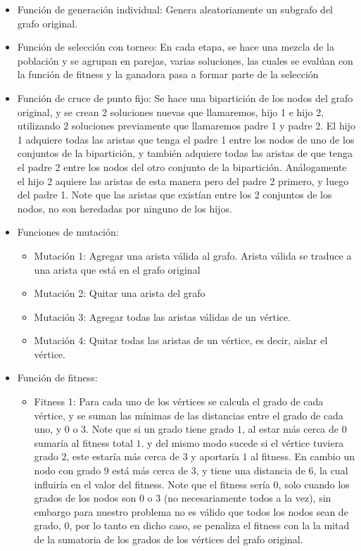 \documentclass{article}
\begin{document}
\begin{itemize}
	\item Función de generación individual: Genera aleatoriamente un subgrafo del grafo original.
	\item Función de selección con torneo: En cada etapa, se hace una mezcla de la población y se agrupan en parejas, varias soluciones, las cuales se evalúan con la función de fitness y la ganadora pasa a formar parte de la selección
	\item Función de cruce de punto fijo: Se hace una bipartición de los nodos del grafo original, y se crean 2 soluciones nuevas que llamaremos, hijo 1 e hijo 2, utilizando 2 soluciones previamente que llamaremos padre 1 y padre 2. El hijo 1 adquiere todas las aristas que tenga el padre 1 entre los nodos de uno de los conjuntos de la bipartición, y también adquiere todas las aristas de que tenga el padre 2 entre los nodos del otro conjunto de la bipartición. Análogamente el hijo 2 aquiere las aristas de esta manera pero del padre 2 primero, y luego del padre 1. Note que las aristas que existían entre los 2 conjuntos de los nodos, no son heredadas por ninguno de los hijos.
	\item Funciones de mutación:
	\begin{itemize}
		\item Mutación 1: Agregar una arista válida al grafo. Arista válida se traduce a una arista que está en el grafo original
		\item Mutación 2: Quitar una arista del grafo
		\item Mutación 3: Agregar todas las aristas válidas de un vértice.
		\item Mutación 4: Quitar todas las aristas de un vértice, es decir, aislar el vértice. 
	\end{itemize}
	\item Función de fitness:
	\begin{itemize}
		\item Fitness 1: Para cada uno de los vértices se calcula el grado de cada vértice, y se suman las mínimas de las distancias entre el grado de cada uno, y $0$ o $3$. Note que si un grado tiene grado $1$, al estar más cerca de $0$ sumaría al fitness total $1$. y del mismo modo sucede si el vértice tuviera grado $2$, este estaría más cerca de $3$ y aportaría $1$ al fitness. En cambio un nodo con grado $9$ está más cerca de $3$, y tiene una distancia de $6$, la cual influiría en el valor del fitness. Note que el fitness sería $0$, solo cuando los grados de los nodos son $0$ o $3$ (no necesariamente todos a la vez), sin embargo para nuestro problema no es válido que todos los nodos sean de grado, $0$, por lo tanto en dicho caso, se penaliza el fitness con la la mitad de la sumatoria de los grados de los vértices del grafo original.

\end{itemize}
\end{itemize}
\end{document}

